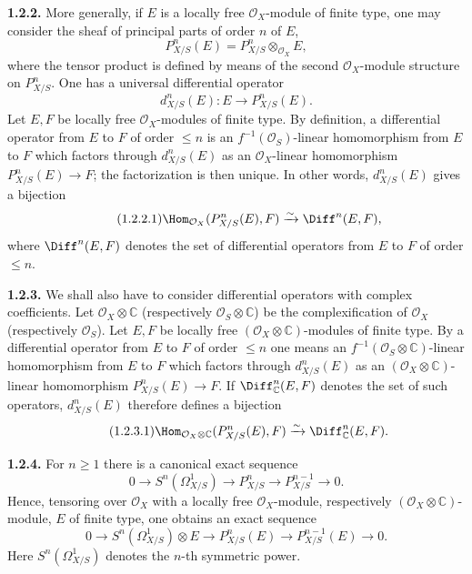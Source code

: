 \documentclass[11pt]{article}
\begin{document}
\textbf{1.2.2.} More generally, if $E$ is a locally free $\mathcal O_X$-module of finite type, one may consider the sheaf of principal parts of order $n$ of $E$,
\[
 P^n_{X/S}(E)=P^n_{X/S}\otimes_{\mathcal O_X}E,
\]
where the tensor product is defined by means of the second $\mathcal O_X$-module structure on $P^n_{X/S}$. One has a universal differential operator
\[
 d^n_{X/S}(E):E\longrightarrow P^n_{X/S}(E).
\]
Let $E,F$ be locally free $\mathcal O_X$-modules of finite type. By definition, a differential operator from $E$ to $F$ of order $\le n$ is an $f^{-1}(\mathcal O_S)$-linear homomorphism from $E$ to $F$ which factors through $d^n_{X/S}(E)$ as an $\mathcal O_X$-linear homomorphism $P^n_{X/S}(E)\to F$; the factorization is then unique. In other words, $d^n_{X/S}(E)$ gives a bijection
\begin{equation}\tag{1.2.2.1}
 \Hom_{\mathcal O_X}(P^n_{X/S}(E),F)\xrightarrow{\sim}\Diff^n(E,F),
\end{equation}
where $\Diff^n(E,F)$ denotes the set of differential operators from $E$ to $F$ of order $\le n$.

\textbf{1.2.3.} We shall also have to consider differential operators with complex coefficients. Let $\mathcal O_X\otimes\mathbb C$ (respectively $\mathcal O_S\otimes\mathbb C$) be the complexification of $\mathcal O_X$ (respectively $\mathcal O_S$). Let $E,F$ be locally free $(\mathcal O_X\otimes\mathbb C)$-modules of finite type. By a differential operator from $E$ to $F$ of order $\le n$ one means an $f^{-1}(\mathcal O_S\otimes\mathbb C)$-linear homomorphism from $E$ to $F$ which factors through $d^n_{X/S}(E)$ as an $(\mathcal O_X\otimes\mathbb C)$-linear homomorphism $P^n_{X/S}(E)\to F$. If $\Diff^n_{\mathbb C}(E,F)$ denotes the set of such operators, $d^n_{X/S}(E)$ therefore defines a bijection
\begin{equation}\tag{1.2.3.1}
 \Hom_{\mathcal O_X\otimes\mathbb C}(P^n_{X/S}(E),F)
 \xrightarrow{\sim}\Diff^n_{\mathbb C}(E,F).
\end{equation}

\textbf{1.2.4.} For $n\ge1$ there is a canonical exact sequence
\[
 0\longrightarrow S^n(\Omega^1_{X/S})\longrightarrow P^n_{X/S}
 \longrightarrow P^{n-1}_{X/S}\longrightarrow 0.
\]
Hence, tensoring over $\mathcal O_X$ with a locally free $\mathcal O_X$-module, respectively $(\mathcal O_X\otimes\mathbb C)$-module, $E$ of finite type, one obtains an exact sequence
\begin{equation}\tag{1.2.4.1}
0\longrightarrow S^n(\Omega^1_{X/S})\otimes E\longrightarrow P^n_{X/S}(E)
\longrightarrow P^{n-1}_{X/S}(E)\longrightarrow0.
\end{equation}
Here $S^n(\Omega^1_{X/S})$ denotes the $n$-th symmetric power.
\end{document}

